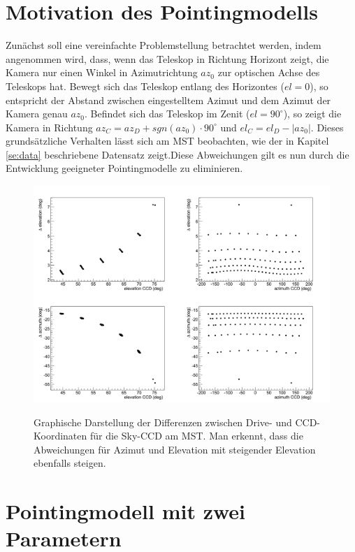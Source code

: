 \section{Motivation des Pointingmodells}
Zunächst soll eine vereinfachte Problemstellung betrachtet werden, indem angenommen wird, dass, wenn das Teleskop in Richtung Horizont zeigt, die Kamera nur einen Winkel in Azimutrichtung $az_0$ zur optischen Achse des Teleskops hat. Bewegt sich das Teleskop entlang des Horizontes ($el=0$), so entspricht der Abstand zwischen eingestelltem Azimut und dem Azimut der Kamera genau $az_0$. Befindet sich das Teleskop im Zenit ($el=90^{\circ}$), so zeigt die Kamera in Richtung $az_C=az_D+\unit{sgn}(az_0)\cdot90^{\circ}$ und $el_C=el_D-|az_0|$. Dieses grundsätzliche Verhalten lässt sich am MST beobachten, wie der in Kapitel \ref{se:data} beschriebene Datensatz zeigt.Diese Abweichungen gilt es nun durch die Entwicklung geeigneter Pointingmodelle zu eliminieren.\newpage
\begin{figure}[htbp]
\centering
\includegraphics[width=\textwidth]{../341/data2.png}
\label{img:dataset}
\caption{Graphische Darstellung der Differenzen zwischen Drive- und CCD-Koordinaten für die Sky-CCD am MST. Man erkennt, dass die Abweichungen für Azimut und Elevation mit steigender Elevation ebenfalls steigen.}
\end{figure}

\section{Pointingmodell mit zwei Parametern}
